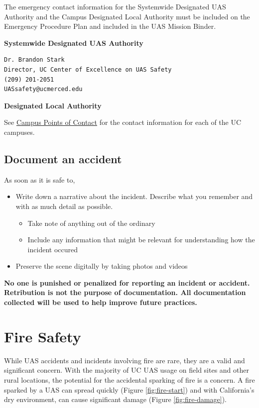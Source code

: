 \documentclass[
]{book}
\providecommand{\tightlist}{%
  \setlength{\itemsep}{0pt}\setlength{\parskip}{0pt}}
\begin{document}
The emergency contact information for the Systemwide Designated UAS Authority and the Campus Designated Local Authority must be included on the Emergency Procedure Plan and included in the UAS Mission Binder.

\textbf{Systemwide Designated UAS Authority}

\begin{verbatim}
Dr. Brandon Stark
Director, UC Center of Excellence on UAS Safety
(209) 201-2051
UASsafety@ucmerced.edu
\end{verbatim}

\textbf{Designated Local Authority}

See \href{https://ucdrones.github.io/ch-DLA.html}{Campus Points of Contact} for the contact information for each of the UC campuses.

\hypertarget{document-an-accident}{%
\section{Document an accident}\label{document-an-accident}}

As soon as it is safe to,

\begin{itemize}
\item
  Write down a narrative about the incident. Describe what you remember and with as much detail as possible.

  \begin{itemize}
  \tightlist
  \item
    Take note of anything out of the ordinary
  \item
    Include any information that might be relevant for understanding how the incident occured
  \end{itemize}
\item
  Preserve the scene digitally by taking photos and videos
\end{itemize}

\textbf{No one is punished or penalized for reporting an incident or accident. Retribution is not the purpose of documentation. All documentation collected will be used to help improve future practices.}

\hypertarget{fire-safety}{%
\chapter{Fire Safety}\label{fire-safety}}

While UAS accidents and incidents involving fire are rare, they are a valid and significant concern. With the majority of UC UAS usage on field sites and other rural locations, the potential for the accidental sparking of fire is a concern. A fire sparked by a UAS can spread quickly (Figure \ref{fig:fire-start}) and with California's dry environment, can cause significant damage (Figure \ref{fig:fire-damage}).
\end{document}
